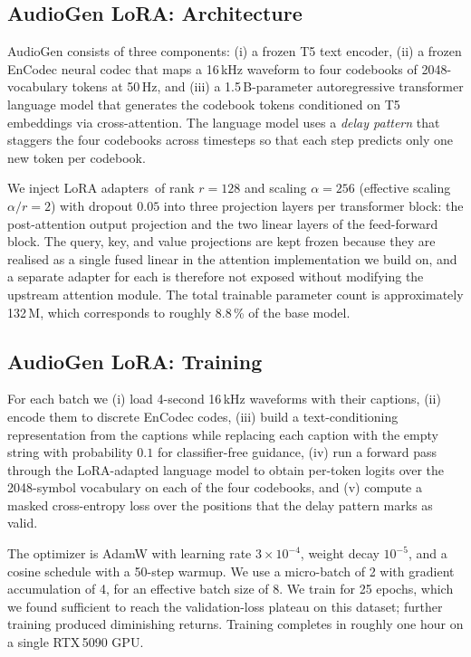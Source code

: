 \documentclass[conference]{IEEEtran}
\begin{document}
\subsection{AudioGen LoRA: Architecture}

AudioGen consists of three components: (i) a frozen T5 text encoder,
(ii) a frozen EnCodec neural codec that maps a 16\,kHz waveform to four
codebooks of 2048-vocabulary tokens at 50\,Hz, and (iii) a
1.5\,B-parameter autoregressive transformer language model that generates
the codebook tokens conditioned on T5 embeddings via cross-attention.
The language model uses a \emph{delay pattern} that staggers the four
codebooks across timesteps so that each step predicts only one new token
per codebook.

We inject LoRA adapters\,\cite{hu2022lora} of rank $r=128$ and scaling
$\alpha=256$ (effective scaling $\alpha/r = 2$) with dropout $0.05$ into
three projection layers per transformer block: the post-attention output
projection and the two linear layers of the feed-forward block. The
query, key, and value projections are kept frozen because they are
realised as a single fused linear in the attention implementation we
build on, and a separate adapter for each is therefore not exposed
without modifying the upstream attention module. The total trainable
parameter count is approximately 132\,M, which corresponds to roughly
8.8\,\% of the base model.

\subsection{AudioGen LoRA: Training}

For each batch we (i) load 4-second 16\,kHz waveforms with their
captions, (ii) encode them to discrete EnCodec codes, (iii) build a
text-conditioning representation from the captions while replacing each
caption with the empty string with probability $0.1$ for classifier-free
guidance, (iv) run a forward pass through the LoRA-adapted language
model to obtain per-token logits over the 2048-symbol vocabulary on each
of the four codebooks, and (v) compute a masked cross-entropy loss over
the positions that the delay pattern marks as valid.

The optimizer is AdamW with learning rate $3\times 10^{-4}$, weight
decay $10^{-5}$, and a cosine schedule with a 50-step warmup. We use a
micro-batch of 2 with gradient accumulation of 4, for an effective batch
size of 8. We train for 25 epochs, which we found sufficient to reach
the validation-loss plateau on this dataset; further training produced
diminishing returns. Training completes in roughly one hour on a single
RTX\,5090 GPU.
\end{document}
